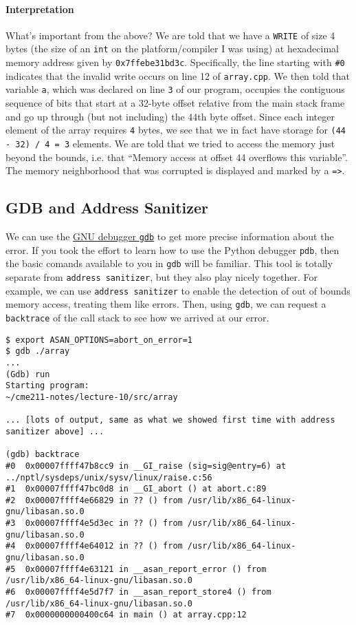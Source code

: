 \documentclass[12pt,letterpaper,twoside]{article}
\begin{document}
\paragraph{Interpretation}
What's important from the above? We are told that we have a
\texttt{WRITE} of size 4 bytes (the size of an \texttt{int} on the platform/compiler
I was using) at hexadecimal memory address given by
\texttt{0x7ffebe31bd3c}. Specifically, the line starting with
\texttt{\#0} indicates that the invalid write occurs on line 12 of
\texttt{array.cpp}. We then told that variable \texttt{a}, which was
declared on line \texttt{3} of our program, occupies the contiguous
sequence of bits that start at a 32-byte offset relative from the main
stack frame and go up through (but not including) the 44th byte
offset. Since each integer element of the array requires \texttt{4}
bytes, we see that we in fact have storage for \texttt{(44 - 32) / 4 =
  3} elements. We are told that we tried to access the memory just
beyond the bounds, i.e. that ``Memory access at offset 44 overflows
this variable''.
The memory neighborhood that was corrupted is displayed and marked by a \texttt{=>}.

\subsection{GDB and Address Sanitizer}
We can use the \href{https://www.gnu.org/software/gdb/}{GNU debugger
  \texttt{gdb}}
to get more precise information
about the error. If you took the effort to learn how to use the Python
debugger \texttt{pdb}, then the basic comands available to you in
\texttt{gdb} will be familiar. This tool is totally separate from
\texttt{address sanitizer}, but they also play nicely together. For
example, we can use \texttt{address sanitizer} to enable the detection
of out of bounds memory access, treating them like errors. Then, using
\texttt{gdb}, we can request a \texttt{backtrace} of the call stack to
see how we arrived at our error.

{\footnotesize
\begin{verbatim}
$ export ASAN_OPTIONS=abort_on_error=1
$ gdb ./array
...
(Gdb) run
Starting program:
~/cme211-notes/lecture-10/src/array

... [lots of output, same as what we showed first time with address sanitizer above] ...

(gdb) backtrace
#0  0x00007ffff47b8cc9 in __GI_raise (sig=sig@entry=6) at
../nptl/sysdeps/unix/sysv/linux/raise.c:56
#1  0x00007ffff47bc0d8 in __GI_abort () at abort.c:89
#2  0x00007ffff4e66829 in ?? () from /usr/lib/x86_64-linux-gnu/libasan.so.0
#3  0x00007ffff4e5d3ec in ?? () from /usr/lib/x86_64-linux-gnu/libasan.so.0
#4  0x00007ffff4e64012 in ?? () from /usr/lib/x86_64-linux-gnu/libasan.so.0
#5  0x00007ffff4e63121 in __asan_report_error () from
/usr/lib/x86_64-linux-gnu/libasan.so.0
#6  0x00007ffff4e5d7f7 in __asan_report_store4 () from
/usr/lib/x86_64-linux-gnu/libasan.so.0
#7  0x0000000000400c64 in main () at array.cpp:12
\end{verbatim}
}
\end{document}
